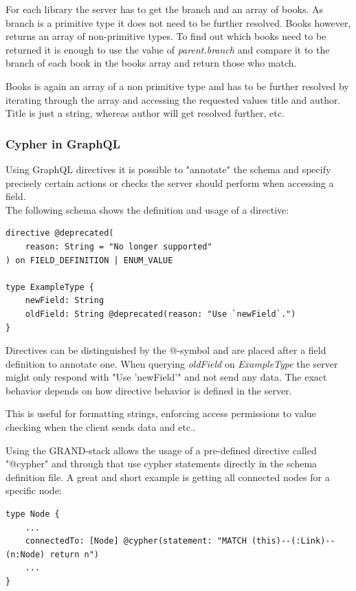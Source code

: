 For each library the server has to get the branch and an array of books. As branch is a primitive type it does not need to be further resolved. Books however, returns an array of non-primitive types. To find out which books need to be returned it is enough to use the value of \emph{parent.branch} and compare it to the branch of each book in the books array and return those who match.

Books is again an array of a non primitive type and has to be further resolved by iterating through the array and accessing the requested values title and author. Title is just a string, whereas author will get resolved further, etc.

\subsubsection{Cypher in GraphQL}
Using GraphQL directives it is possible to "annotate" the schema and specify precisely certain actions or checks the server should perform when accessing a field. \\
The following schema shows the definition and usage of a directive: \cite{GraphQlDir}

\lstset{language=GraphQL}
\begin{lstlisting}[caption={Example Directive Declaration}]
directive @deprecated( 
	reason: String = "No longer supported" 
) on FIELD_DEFINITION | ENUM_VALUE 

type ExampleType { 
	newField: String 
	oldField: String @deprecated(reason: "Use `newField`.")
}
\end{lstlisting}

Directives can be distinguished by the @-symbol and are placed after a field definition to annotate one. When querying \emph{oldField} on \emph{ExampleType} the server might only respond with "Use 'newField'" and not send any data. The exact behavior depends on how directive behavior is defined in the server.

This is useful for formatting strings, enforcing access permissions to value checking when the client sends data and etc.. 

Using the GRAND-stack allows the usage of a pre-defined directive called "@cypher" and through that use cypher statements directly in the schema definition file. A great and short example is getting all connected nodes for a specific node:

\begin{lstlisting}[caption={Cypher in GraphQL}]
type Node { 
	... 
	connectedTo: [Node] @cypher(statement: "MATCH (this)--(:Link)--(n:Node) return n") 
	...
}
\end{lstlisting}

